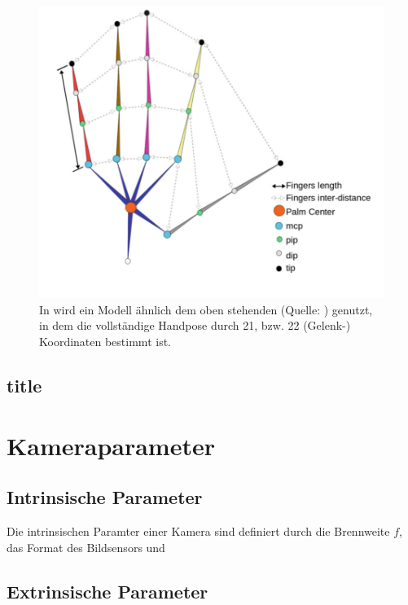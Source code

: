 	\begin{figure}
		\centering
		\includegraphics[width=0.7\linewidth]{Ressourcen/malik2018_hand_model}
		\caption[Handmodell nach \cite{Malik2018b}]{In \cite{Malik2018b} wird ein Modell ähnlich dem oben stehenden (Quelle: \cite{Malik2018b}) genutzt, in dem die vollständige Handpose durch 21, bzw. 22 (Gelenk-) Koordinaten bestimmt ist.}
		\label{fig:malik2018handmodel}
	\end{figure}
	
	
	\subsection{title}
	
	
\section{Kameraparameter}
\subsection{Intrinsische Parameter}
Die intrinsischen Paramter einer Kamera sind definiert durch die Brennweite $f$, das Format des Bildsensors und 
\subsection{Extrinsische Parameter}
	